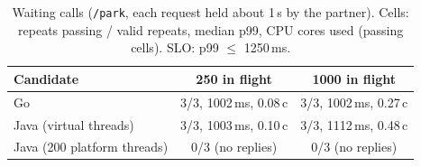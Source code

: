 \begin{table}[t]
\caption{Waiting calls (\texttt{/park}, each request held about 1\,s by the partner). Cells: repeats passing / valid repeats, median p99, CPU cores used (passing cells). SLO: p99 $\le$ 1250\,ms.}
\label{tab:park}
\centering\small
\begin{tabular}{lcc}
\toprule
Candidate & 250 in flight & 1000 in flight \\
\midrule
Go & 3/3, 1002\,ms, 0.08\,c & 3/3, 1002\,ms, 0.27\,c \\
Java (virtual threads) & 3/3, 1003\,ms, 0.10\,c & 3/3, 1112\,ms, 0.48\,c \\
Java (200 platform threads) & 0/3 (no replies) & 0/3 (no replies) \\
\bottomrule
\end{tabular}
\end{table}

